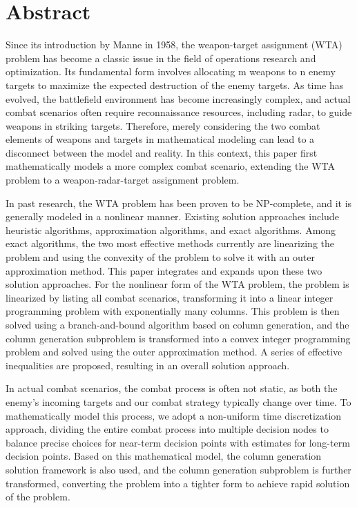\intobmk\chapter*{Abstract}%
Since its introduction by Manne in 1958, the weapon-target assignment (WTA) problem has become a classic issue in the field of operations research and optimization. Its fundamental form involves allocating m weapons to n enemy targets to maximize the expected destruction of the enemy targets. As time has evolved, the battlefield environment has become increasingly complex, and actual combat scenarios often require reconnaissance resources, including radar, to guide weapons in striking targets. Therefore, merely considering the two combat elements of weapons and targets in mathematical modeling can lead to a disconnect between the model and reality. In this context, this paper first mathematically models a more complex combat scenario, extending the WTA problem to a weapon-radar-target assignment problem.

In past research, the WTA problem has been proven to be NP-complete, and it is generally modeled in a nonlinear manner. Existing solution approaches include heuristic algorithms, approximation algorithms, and exact algorithms. Among exact algorithms, the two most effective methods currently are linearizing the problem and using the convexity of the problem to solve it with an outer approximation method. This paper integrates and expands upon these two solution approaches. For the nonlinear form of the WTA problem, the problem is linearized by listing all combat scenarios, transforming it into a linear integer programming problem with exponentially many columns. This problem is then solved using a branch-and-bound algorithm based on column generation, and the column generation subproblem is transformed into a convex integer programming problem and solved using the outer approximation method. A series of effective inequalities are proposed, resulting in an overall solution approach.

In actual combat scenarios, the combat process is often not static, as both the enemy's incoming targets and our combat strategy typically change over time. To mathematically model this process, we adopt a non-uniform time discretization approach, dividing the entire combat process into multiple decision nodes to balance precise choices for near-term decision points with estimates for long-term decision points. Based on this mathematical model, the column generation solution framework is also used, and the column generation subproblem is further transformed, converting the problem into a tighter form to achieve rapid solution of the problem.

